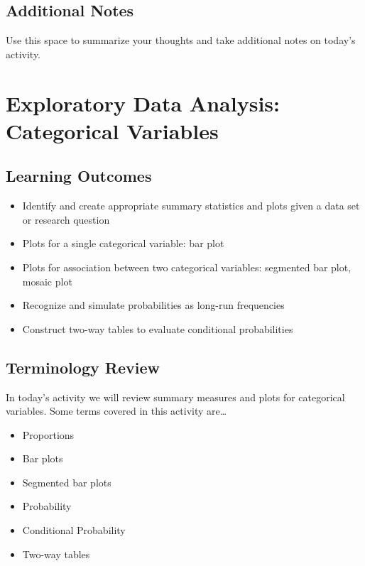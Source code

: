 \documentclass[
]{report}
\begin{document}
\hypertarget{additional-notes}{%
\section{Additional Notes}\label{additional-notes}}

Use this space to summarize your thoughts and take additional notes on today's activity.

\hypertarget{exploratory-data-analysis-categorical-variables}{%
\chapter{Exploratory Data Analysis: Categorical Variables}\label{exploratory-data-analysis-categorical-variables}}

\hypertarget{learning-outcomes}{%
\section{Learning Outcomes}\label{learning-outcomes}}

\begin{itemize}
\item
  Identify and create appropriate summary statistics and plots
  given a data set or research question
\item
  Plots for a single categorical variable: bar plot
\item
  Plots for association between two categorical variables:
  segmented bar plot, mosaic plot
\item
  Recognize and simulate probabilities as long-run frequencies
\item
  Construct two-way tables to evaluate conditional probabilities
\end{itemize}

\hypertarget{terminology-review}{%
\section{Terminology Review}\label{terminology-review}}

In today's activity we will review summary measures and plots for categorical variables. Some terms covered in this activity are\ldots{}

\begin{itemize}
\item
  Proportions
\item
  Bar plots
\item
  Segmented bar plots
\item
  Probability
\item
  Conditional Probability
\item
  Two-way tables
\end{itemize}
\end{document}
